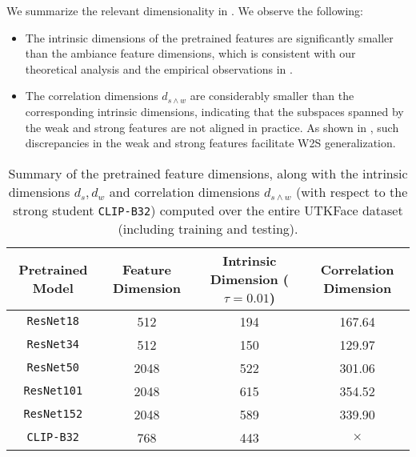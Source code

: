 We summarize the relevant dimensionality in . We observe the following:
\begin{itemize}
    \item The intrinsic dimensions of the pretrained features are significantly smaller than the ambiance feature dimensions, which is consistent with our theoretical analysis and the empirical observations in \cite{aghajanyan2020intrinsic}. 
    \item The correlation dimensions $d_{s \wedge w}$ are considerably smaller than the corresponding intrinsic dimensions, indicating that the subspaces spanned by the weak and strong features are not aligned in practice. As shown in , such discrepancies in the weak and strong features facilitate W2S generalization.
\end{itemize}

\begin{table}[!ht]
    \centering
    \caption{Summary of the pretrained feature dimensions, along with the intrinsic dimensions $d_s, d_w$ and correlation dimensions $d_{s \wedge w}$ (with respect to the strong student \texttt{CLIP-B32}) computed over the entire UTKFace dataset (including training and testing).}\label{tab:img_reg_dim}
    \begin{tabular}{c|ccc}
        \toprule
        Pretrained Model & Feature Dimension & Intrinsic Dimension ($\tau=0.01$) & Correlation Dimension \\
        \midrule
        \texttt{ResNet18} & 512 & 194 & 167.64 \\
        \texttt{ResNet34} & 512 & 150 & 129.97 \\
        \texttt{ResNet50} & 2048 & 522 & 301.06 \\
        \texttt{ResNet101} & 2048 & 615 & 354.52 \\
        \texttt{ResNet152} & 2048 & 589 & 339.90 \\
        \midrule
        \texttt{CLIP-B32} & 768 & 443 & $\times$ \\
        \bottomrule
    \end{tabular}
\end{table}

